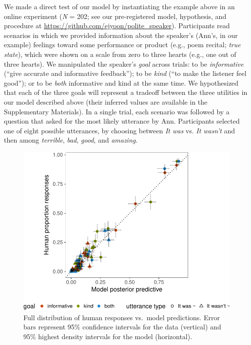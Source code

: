 \documentclass[12pt]{article}
\begin{document}
We made a direct test of our model by instantiating the example above in
an online experiment (\emph{N} = 202; see our pre-registered model,
hypothesis, and procedure at
\url{https://github.com/ejyoon/polite_speaker}). Participants read
scenarios in which we provided information about the speaker's (Ann's,
in our example) feelings toward some performance or product (e.g., poem
recital; \emph{true state}), which were shown on a scale from zero to
three hearts (e.g., one out of three hearts). We manipulated the
speaker's \emph{goal} across trials: to be \emph{informative}
(\enquote{give accurate and informative feedback}); to be \emph{kind}
(\enquote{to make the listener feel good}); or to be \emph{both}
informative and kind at the same time. We hypothesized that each of
the three goals will represent a tradeoff between the three utilities in
our model described above (their inferred values are available in the
Supplementary Materials). In a single trial, each scenario was followed
by a question that asked for the most likely utterance by Ann.
Participants selected one of eight possible utterances, by choosing
between \emph{It was} vs. \emph{It wasn't} and then among
\emph{terrible}, \emph{bad}, \emph{good}, and \emph{amazing.}


\begin{figure}
\centering
\includegraphics{polite_manuscript_files/figure-latex/variance-1.pdf}
\caption{\label{fig:variance}Full distribution of human responses vs.~model
predictions. Error bars represent 95\% confidence intervals for the data
(vertical) and 95\% highest density intervals for the model
(horizontal).}
\end{figure}
\end{document}
